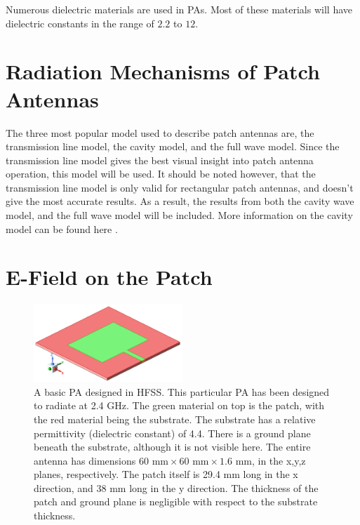 \documentclass[12pt]{article}
\begin{document}
Numerous dielectric materials are used in PAs. Most of these materials will have dielectric constants in the range of $2.2$ to $12$\cite{balanis2016antenna}. 
\section{Radiation Mechanisms of Patch Antennas}

The three most popular model used to describe patch antennas are, the transmission line model, the cavity model, and the full wave model\cite{balanis2016antenna}. Since the transmission line model gives the best visual insight\cite{balanis2016antenna} into patch antenna operation, this model will be used. It should be noted however, that the transmission line model is only valid for rectangular patch antennas, and doesn't give the most accurate results\cite{balanis2016antenna}. As a result, the results from both the cavity wave model, and the full wave model will be included. More information on the cavity model can be found here \cite{balanis2016antenna}. 


\section{E-Field on the Patch}
 

\begin{figure}[h]
    \centering
    \includegraphics[width=0.5\textwidth]{2.4GHz-basic-pa.png}
    \caption{A basic PA designed in HFSS. This particular PA has been designed to radiate at 2.4 GHz. The green material on top is the patch, with the red material being the substrate. The substrate has a relative permittivity (dielectric constant) of 4.4. There is a ground plane beneath the substrate, although it is not visible here. The entire antenna has dimensions $60 \text{ mm} \times 60 \text{ mm} \times 1.6 \text{ mm}$, in the x,y,z planes, respectively. The patch itself is 29.4 mm long in the x direction, and 38 mm long in the y direction. The thickness of the patch and ground plane is negligible with respect to the substrate thickness. }
\end{figure}
\end{document}
